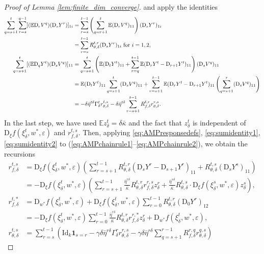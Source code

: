 \documentclass[11pt,letterpaper,reqno]{amsart}
\theoremstyle{definition}
\def\eps{\varepsilon}
\def\D{\mathrm{D}}
\def\E{\mathbb{E}}
\def\Id{\mathrm{Id}}
\def\1{\mathbf{1}}
\begin{document}
\begin{proof}[Proof of Lemma \ref{lem:finite_dim_converge}]
and apply the identities
\begin{align}
\sum_{q=s+1}^t \sum_{r=s}^{q-1} [(\E \D_r V^q)(\D_s Y^r)]_{1i}
&=\sum_{r=s}^{t-1}\left(\sum_{q=r+1}^t \E(\D_r V^q)_{11} \right)(\D_s
Y^r)_{1i}\notag\\
&=\sum_{r=s}^{t-1} R_{\theta,\delta}^{t,r}(\D_s Y^r)_{1i}
\text{ for } i=1,2,\label{eq:sumidentity1}\\
\sum_{q=s+1}^t [(\E \D_q Y^t)(\D_s V^q)]_{11}
&=\sum_{q=s+1}^t \left(\E(\D_t Y^t)_{11}+\sum_{r=q}^{t-1}
\E(\D_r Y^t-\D_{r+1} Y^t)_{11}\right)(\D_s V^q)_{11}\notag\\
&=\E(\D_t Y^t)_{11} \sum_{q=s+1}^t (\D_s V^q)_{11}
+\sum_{r=s+1}^{t-1}
\E(\D_r Y^t-\D_{r+1} Y^t)_{11}\left(\sum_{q=s+1}^r (\D_s V^q)_{11}\right)\notag\\
&={-}\delta\bar\eta^{t\delta} \Gamma_\delta^t r_{\theta,\delta}^{t,s}
-\delta\bar \eta^{t\delta}\sum_{r=s+1}^{t-1} R_{f,\delta}^{t,r}
r_{\theta,\delta}^{r,s}.
\label{eq:sumidentity2}
\end{align}
In the last step, we have used $\E z_\delta^t=\delta\bar\kappa$ and the fact
that $z_\delta^t$ is independent of
$\D_\xi f(\xi_\delta^t,w^*,\eps)$ and $r_{f,\delta}^{t,s}$.
Then, applying \eqref{eq:AMPresponsedefs},
\eqref{eq:sumidentity1}, \eqref{eq:sumidentity2} to
(\ref{eq:AMPchainrule1}--\ref{eq:AMPchainrule2}), we obtain the recursions
\begin{align*}
r_{f,\delta}^{t,s}&=\D_\xi f(\xi_\delta^t,w^*,\eps)
\left(\sum_{r=s+1}^{t-1}
R_{\theta,\delta}^{t,r}(\D_s Y^r-\D_{s+1}Y^r)_{11}
+R_{\theta,\delta}^{t,s}(\D_s Y^s)_{11}\right)\\
&={-}\D_\xi f(\xi_\delta^t,w^*,\eps)
\left(\sum_{r=s+1}^{t-1}
\frac{\bar\eta^{r\delta}}{\bar\kappa}
R_{\theta,\delta}^{t,r}r_{f,\delta}^{r,s}z_\delta^r
+\frac{\bar\eta^{s\delta}}{\bar\kappa} R_{\theta,\delta}^{t,s} \cdot
\D_\xi f(\xi_\delta^s,w^*,\eps)z_\delta^s\right),\\
r_{f,\delta}^{t,*}&=
\D_{w^*} f(\xi_\delta^t,w^*,\eps)
+\D_\xi f(\xi_\delta^t,w^*,\eps)\sum_{r=0}^{t-1}R_{\theta,\delta}^{t,r}
(\D_0 Y^r)_{12}\\
&={-}\D_\xi f(\xi_\delta^t,w^*,\eps)
\sum_{r=0}^{t-1} \frac{\bar\eta^{r\delta}}{\bar\kappa}
R_{\theta,\delta}^{t,r}r_{f,\delta}^{r,*}z_\delta^r
+\D_{w^*} f(\xi_\delta^t,w^*,\eps),\\
r_{\theta,\delta}^{t,s}&=\sum_{r=s}^{t-1} \left(
\Id_k\1_{s=r}-\gamma \delta\bar\eta^{r\delta} \Gamma_\delta^r
r_{\theta,\delta}^{r,s}
-\gamma\delta\bar\eta^{r\delta}\sum_{q=s+1}^{r-1}
R_{f,\delta}^{r,q}r_{\theta,\delta}^{q,s}\right)

\end{align*}
\end{proof}
\end{document}
